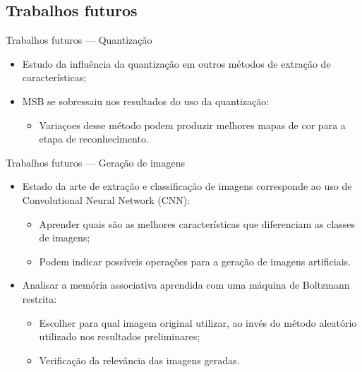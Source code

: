 \documentclass{beamer}
\begin{document}
\subsection{Trabalhos futuros}
\begin{frame}{Trabalhos futuros --- Quantização}
  \setlength\leftmargini{1em}
  \justifying
  \begin{itemize}
    \item Estudo da influência da quantização em outros métodos de extração de características;
    \item MSB se sobressaiu nos resultados do uso da quantização:
    \begin{itemize}
      \item Variaçoes desse método podem produzir melhores mapas de cor para a etapa de reconhecimento.
    \end{itemize}
  \end{itemize}
\end{frame}
\begin{frame}{Trabalhos futuros --- Geração de imagens}
  \setlength\leftmargini{1em}
  \justifying
  \begin{itemize}
  \item Estado da arte de extração e classificação de imagens corresponde ao uso de Convolutional Neural Network (CNN):
    \begin{itemize}
    \item Aprender quais são as melhores características que diferenciam as classes de imagens;
    \item Podem indicar possíveis operações para a geração de imagens artificiais.
    \end{itemize}
  \item Analisar a memória associativa aprendida com uma máquina de Boltzmann restrita:
    \begin{itemize}
    \item Escolher para qual imagem original utilizar, ao invés do método aleatório utilizado nos resultados preliminares;
    \item Verificação da relevância das imagens geradas.
    \end{itemize}
  \end{itemize}
\end{frame}
\end{document}
